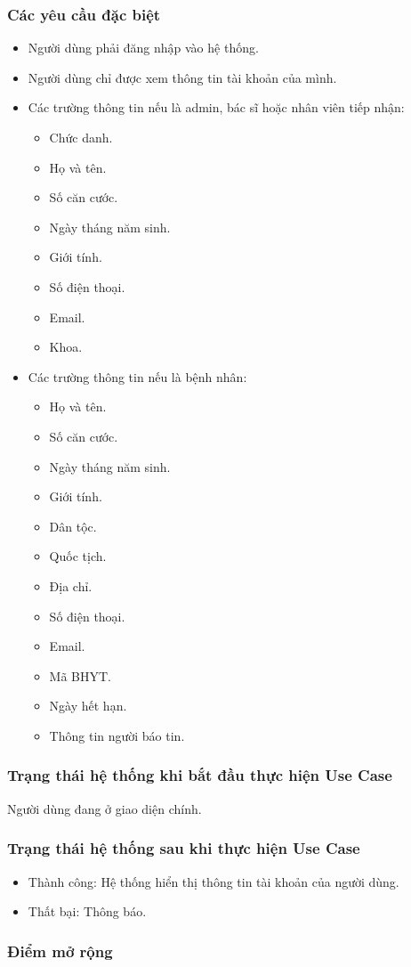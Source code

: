 \subsubsection{Các yêu cầu đặc biệt}
\begin{itemize}
  \item Người dùng phải đăng nhập vào hệ thống.
  \item Người dùng chỉ được xem thông tin tài khoản của mình.
  \item Các trường thông tin nếu là admin, bác sĩ hoặc nhân viên tiếp nhận:
    \begin{itemize}
      \item Chức danh.
      \item Họ và tên.
      \item Số căn cước.
      \item Ngày tháng năm sinh.
      \item Giới tính.
      \item Số điện thoại.
      \item Email.
      \item Khoa.
    \end{itemize}
  \item Các trường thông tin nếu là bệnh nhân:
    \begin{itemize}
      \item Họ và tên.
      \item Số căn cước.
      \item Ngày tháng năm sinh.
      \item Giới tính.
      \item Dân tộc.
      \item Quốc tịch.
      \item Địa chỉ.
      \item Số điện thoại.
      \item Email.
      \item Mã BHYT.
      \item Ngày hết hạn.
      \item Thông tin người báo tin.
    \end{itemize}
\end{itemize}

\subsubsection{Trạng thái hệ thống khi bắt đầu thực hiện Use Case}
Người dùng đang ở giao diện chính.

\subsubsection{Trạng thái hệ thống sau khi thực hiện Use Case}
\begin{itemize}
  \item Thành công: Hệ thống hiển thị thông tin tài khoản của người dùng.
  \item Thất bại: Thông báo.
\end{itemize}

\subsubsection{Điểm mở rộng}